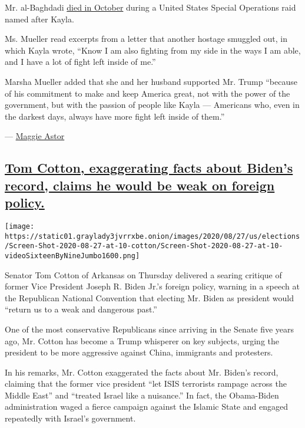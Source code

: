 Mr. al-Baghdadi
\href{https://www.nytimes3xbfgragh.onion/2019/10/27/world/middleeast/al-baghdadi-dead.html}{died
in October} during a United States Special Operations raid named after
Kayla.

Ms. Mueller read excerpts from a letter that another hostage smuggled
out, in which Kayla wrote, ``Know I am also fighting from my side in the
ways I am able, and I have a lot of fight left inside of me.''

Marsha Mueller added that she and her husband supported Mr. Trump
``because of his commitment to make and keep America great, not with the
power of the government, but with the passion of people like Kayla ---
Americans who, even in the darkest days, always have more fight left
inside of them.''

--- \href{https://www.nytimes3xbfgragh.onion/by/maggie-astor}{Maggie
Astor}

\hypertarget{tom-cotton-exaggerating-facts-about-bidens-record-claims-he-would-be-weak-on-foreign-policy}{%
\subsection{\texorpdfstring{\protect\hyperlink{tom-cotton-exaggerating-facts-about-bidens-record-claims-he-would-be-weak-on-foreign-policy}{Tom
Cotton, exaggerating facts about Biden's record, claims he would be weak
on foreign
policy.}}{Tom Cotton, exaggerating facts about Biden's record, claims he would be weak on foreign policy.}}\label{tom-cotton-exaggerating-facts-about-bidens-record-claims-he-would-be-weak-on-foreign-policy}}

\texttt{[image: https://static01.graylady3jvrrxbe.onion/images/2020/08/27/us/elections/Screen-Shot-2020-08-27-at-10-cotton/Screen-Shot-2020-08-27-at-10-videoSixteenByNineJumbo1600.png]}

Senator Tom Cotton of Arkansas on Thursday delivered a searing critique
of former Vice President Joseph R. Biden Jr.'s foreign policy, warning
in a speech at the Republican National Convention that electing Mr.
Biden as president would ``return us to a weak and dangerous past.''

One of the most conservative Republicans since arriving in the Senate
five years ago, Mr. Cotton has become a Trump whisperer on key subjects,
urging the president to be more aggressive against China, immigrants and
protesters.

In his remarks, Mr. Cotton exaggerated the facts about Mr. Biden's
record, claiming that the former vice president ``let ISIS terrorists
rampage across the Middle East'' and ``treated Israel like a nuisance.''
In fact, the Obama-Biden administration waged a fierce campaign against
the Islamic State and engaged repeatedly with Israel's government.

